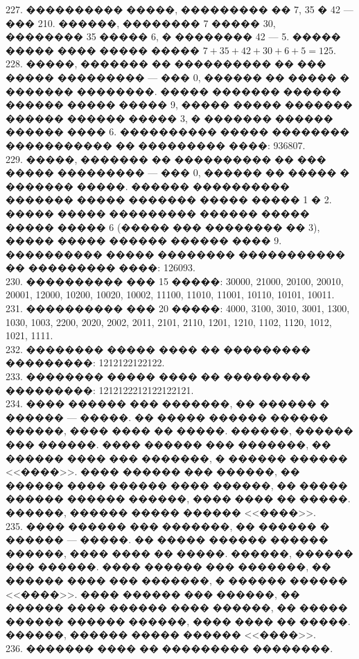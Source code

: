 \documentclass[12pt]{article}
\begin{document}
227. ���������� �����, ��������� �� 7, 35 � 42 --- ��� 210. ������, �������� 7 ����� 30, �������� 35 ����� 6, � �������� 42 --- 5. ����� ����� ���� ����� ����� $7+35+42+30+6+5=125.$\\
228. �����, ������� �� ���������� �� ��� ����� ��������� --- ��� 0, ������ �� ����� � ������� ��������. ����� ������� ������ ������ ����� ����� 9, ����� ����� ������� ������ ������ ����� 3, � ������� ������ ������ ���� 6. ���������� ����� �������� ����������� �� ��������� ����: 936807.\\
229. �����, ������� �� ���������� �� ��� ����� ��������� --- ��� 0, ������ �� ����� � ������� �����. ������ ���������� ������� ����� ������� ����� ����� 1 � 2. ����� ����� ��������� ������ ����� ����� ����� 6 (����� ��� �������� �� 3), ����� ����� ������ ������ ���� 9. ���������� ����� �������� ����������� �� ��������� ����: 126093.\\
230. ���������� ��� 15 �����: 30000, 21000, 20100, 20010, 20001, 12000, 10200, 10020, 10002, 11100, 11010, 11001, 10110, 10101, 10011.\\
231. ���������� ��� 20 �����: 4000, 3100, 3010, 3001, 1300, 1030, 1003, 2200, 2020, 2002, 2011, 2101, 2110, 1201, 1210, 1102, 1120, 1012, 1021, 1111.\\
232. �������� ����� ���� �� ��������� ���������: 1212122122122.\\
233. �������� ����� ���� �� ��������� ���������: 1212122212122122121.\\
234. ���� ������ ��� �������, �� ������ � ������ --- �����. �� ����� ������ ������ ������, ���� ���� �� �����. ������, ������ ��� ������. ���� ������ ��� �������, �� ������ ���� ��� �������, � ������ ������ <<����>>. ���� ������ ��� ������, �� ������ ���� ������ ���� ������, �� ����� ������ ������ ������, ���� ���� �� �����. ������, ������ ����� ������ <<����>>.\\
235. ���� ������ ��� �������, �� ������ � ������ --- �����. �� ����� ������ ������ ������, ���� ���� �� �����. ������, ������ ��� ������. ���� ������ ��� �������, �� ������ ���� ��� �������, � ������ ������ <<����>>. ���� ������ ��� ������, �� ������ ���� ������ ���� ������, �� ����� ������ ������ ������, ���� ���� �� �����. ������, ������ ����� ������ <<����>>.\\
236. ������� ���� �� ��������� ��������.
\begin{center}
\begin{figure}[ht!]
\end{figure}
\end{center}
\end{document}
